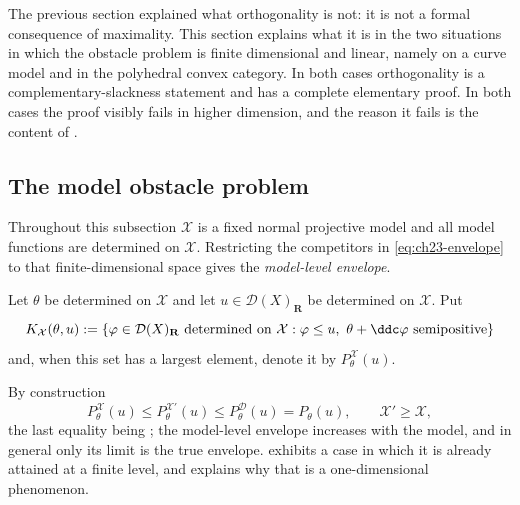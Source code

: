 The previous section explained what orthogonality is not: it is not a
formal consequence of maximality.  This section explains what it is in the
two situations in which the obstacle problem is finite dimensional and
linear, namely on a curve model and in the polyhedral convex category.  In
both cases orthogonality is a complementary-slackness statement and has a
complete elementary proof.  In both cases the proof visibly fails in higher
dimension, and the reason it fails is the content of
.

\subsection{The model obstacle problem}
\label{sec:ch23-model-obstacle-problem}

Throughout this subsection \(\mathcal X\) is a fixed normal projective model
and all model functions are determined on \(\mathcal X\).  Restricting the
competitors in \eqref{eq:ch23-envelope} to that finite-dimensional space
gives the \emph{model-level envelope}.

\begin{definition}
\label{def:ch23-fixed-model-envelope}
Let \(\theta\) be determined on \(\mathcal X\) and let
\(u\in\mathcal D(X)_{\mathbf R}\) be determined on \(\mathcal X\).  Put
\begin{equation}\label{eq:ch23-fixed-model-competitors}
 K_{\mathcal X}(\theta,u)
 :=\{\varphi\in\mathcal D(X)_{\mathbf R}\ \text{determined on }\mathcal X:
     \varphi\leq u,\ \theta+\ddc\varphi\ \text{semipositive}\}
\end{equation}
and, when this set has a largest element, denote it by
\(P^{\mathcal X}_\theta(u)\).
\end{definition}

By construction
\begin{equation}\label{eq:ch23-model-level-below}
 P^{\mathcal X}_\theta(u)\leq P^{\mathcal X'}_\theta(u)
 \leq P^{\mathcal D}_\theta(u)=P_\theta(u),
 \qquad \mathcal X'\geq\mathcal X,
\end{equation}
the last equality being
; the model-level envelope
increases with the model, and in general only its limit is the true
envelope.   exhibits a case in which it
is already attained at a finite level, and
 explains why that is a one-dimensional
phenomenon.

